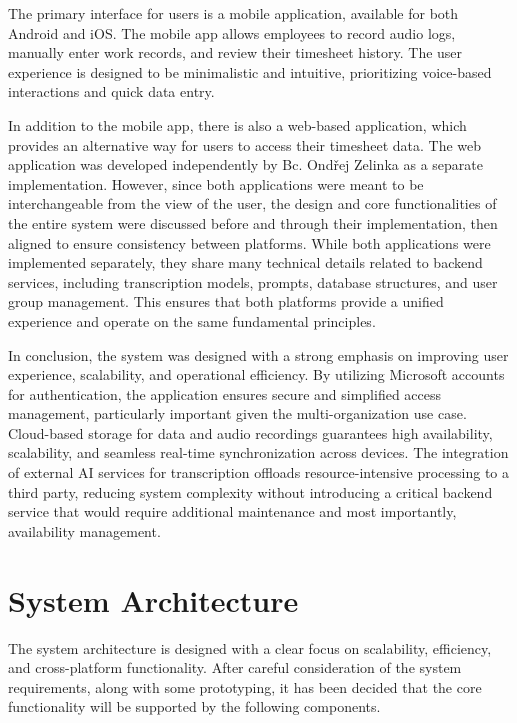 \documentclass[
  digital,     %
  oneside,     %
  nosansbold,  %
  nocolorbold, %
  lof,         %
  lot,         %
]{fithesis4}
\begin{document}
\begin{markdown}
The primary interface for users is a mobile application, available for both Android and iOS. The mobile app allows employees to record audio logs, manually enter work records, and review their timesheet history. The user experience is designed to be minimalistic and intuitive, prioritizing voice-based interactions and quick data entry.

In addition to the mobile app, there is also a web-based application, which provides an alternative way for users to access their timesheet data. The web application was developed independently by Bc. Ondřej Zelinka as a separate implementation. However, since both applications were meant to be interchangeable from the view of the user, the design and core functionalities of the entire system were discussed before and through their implementation, then aligned to ensure consistency between platforms. While both applications were implemented separately, they share many technical details related to backend services, including transcription models, prompts, database structures, and user group management. This ensures that both platforms provide a unified experience and operate on the same fundamental principles.

In conclusion, the system was designed with a strong emphasis on improving user experience, scalability, and operational efficiency. By utilizing Microsoft accounts for authentication, the application ensures secure and simplified access management, particularly important given the multi-organization use case. Cloud-based storage for data and audio recordings guarantees high availability, scalability, and seamless real-time synchronization across devices. The integration of external AI services for transcription offloads resource-intensive processing to a third party, reducing system complexity without introducing a critical backend service that would require additional maintenance and most importantly, availability management.

\end{markdown}

\section{System Architecture}

The system architecture is designed with a clear focus on scalability, efficiency, and cross-platform functionality. After careful consideration of the system requirements, along with some prototyping, it has been decided that the core functionality will be supported by the following components.
\end{document}
